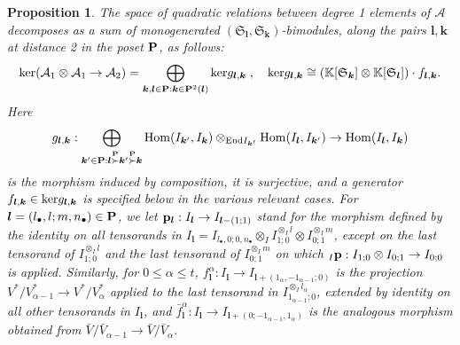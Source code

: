 \documentclass[12pt]{article}
\def\KK {{\mathbb K}}     %
\def\mc {\mathcal}
\def\mk {\mathfrak}
\newtheorem{prop}[theorem]{Proposition}
\begin{document}
\begin{prop}\label{Prop A QuadRel}
The space of quadratic relations between degree 1 elements of $\mc A$ decomposes as a sum of monogenerated $(\mk S_{\bm l},\mk S_{\bm k})$-bimodules, along the pairs $\bm l,\bm k$ at distance 2 in the poset ${\bf P}$, as follows:
$$
{\rm ker}(\mc A_1\otimes\mc A_1\to\mc A_2) = \bigoplus\limits_{\bm k,\bm l\in{\bf P}:\bm k\in{\bf P}^2(\bm l)} {\rm ker}g_{\bm l,\bm k} \;,\quad {\rm ker}g_{\bm l,\bm k} \cong (\KK[\mk S_{\bm k}]\otimes \KK[\mk S_{\bm l}])\cdot f_{\bm l,\bm k}.
$$
Here
\begin{gather*}
g_{\bm l,\bm k}:\bigoplus\limits_{\bm k'\in{\bf P}:\bm l\stackrel{\bf P}{\succ}\bm k'\stackrel{\bf P}{\succ}\bm k} {\rm Hom}(I_{\bm k'},I_{\bm k})\otimes_{{\rm End}I_{\bm k'}}{\rm Hom}(I_{\bm l},I_{\bm k'}) \to {\rm Hom}(I_{\bm l},I_{\bm k})
\end{gather*}
is the morphism induced by composition, it is surjective, and a generator $f_{\bm l,\bm k}\in {\rm ker}g_{\bm l,\bm k}$ is specified below in the various relevant cases. For $\bm l=(l_\bullet,l;m,n_\bullet)\in{\bf P}$, we let ${\bf p}_{\bm l}:I_{\bm l}\to I_{\bm l-(1;1)}$ stand for the morphism defined by the identity on all tensorands in $I_{\bm l}=I_{l_\bullet,0;0,n_\bullet}\otimes_I I_{1;0}^{\otimes_I l} \otimes I_{0;1}^{\otimes_I m}$, except on the last tensorand of $I_{1;0}^{\otimes_I l}$ and the last tensorand of $I_{0;1}^{\otimes_I m}$ on which ${_I}{\bf p}:I_{1;0}\otimes I_{0;1}\to I_{0;0}$ is applied. Similarly, for $0\leq\alpha\leq t$, $f^{\alpha}_{\bm l}:I_{\bm l}\to I_{\bm l+(1_\alpha,-1_{\alpha-1};0)}$ is the projection $V^*/V^*_{\alpha-1}\to V^*/V^*_{\alpha}$ applied to the last tensorand in $I_{1_{\alpha-1};0}^{\otimes_I l_{\alpha}}$, extended by identity on all other tensorands in $I_{\bm l}$, and $\bar f^{\alpha}_{\bm l}:I_{\bm l}\to I_{\bm l +(0;-1_{\alpha-1},1_{\alpha})}$ is the analogous morphism obtained from $\bar V/\bar V_{\alpha-1}\to \bar V/\bar V_{\alpha}$.


\end{prop}
\end{document}
